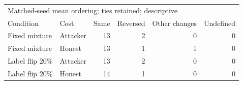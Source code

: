\begin{tabular}{llrrrr}
\toprule
\multicolumn{6}{l}{Matched-seed mean ordering; ties retained; descriptive} \\
Condition & Cost & Same & Reversed & Other changes & Undefined \\
\midrule
Fixed mixture & Attacker & 13 & 2 & 0 & 0 \\
Fixed mixture & Honest & 13 & 1 & 1 & 0 \\
Label flip 20\% & Attacker & 13 & 2 & 0 & 0 \\
Label flip 20\% & Honest & 14 & 1 & 0 & 0 \\
\bottomrule
\end{tabular}
